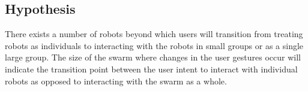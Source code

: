 \subsection{Hypothesis}

There exists a number of robots beyond which users will transition from treating robots as individuals to interacting with the robots in small groups or as a single large group. 
The size of the swarm where changes in the user gestures occur will indicate the transition point between the user intent to interact with individual robots as opposed to interacting with the swarm as a whole. 

